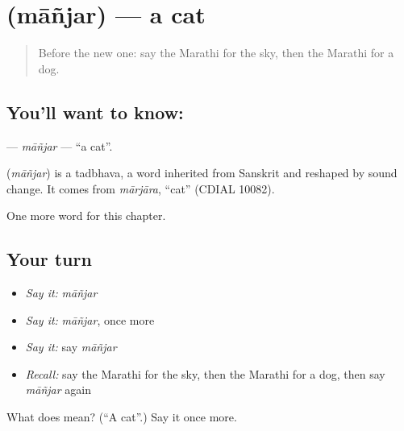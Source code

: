 \section[\texorpdfstring{\mr{मांजर} (māñjar)}{मांजर (māñjar)}]{ (māñjar) — a cat}

\label{lesson:MR-C99-manjar}



\begin{quote}
Before the new one: say the Marathi for the sky, then the Marathi for a dog.
\end{quote}

\subsection*{You'll want to know: }
\textbf{} — \emph{māñjar} — \textquotedblleft{}a cat\textquotedblright{}.

\begin{cousinweb}
\textbf{} (\emph{māñjar}) is a tadbhava, a word inherited from Sanskrit and reshaped by sound change. It comes from \emph{mārjāra}, \textquotedblleft{}cat\textquotedblright{} (CDIAL 10082).
\end{cousinweb}

\begin{grammarlens}[title={What you've built}]
One more word for this chapter.
\end{grammarlens}

\subsection*{Your turn}
\begin{itemize}
\raggedright
  \item \emph{Say it:} \emph{māñjar}
  \item \emph{Say it:} \emph{māñjar}, once more
  \item \emph{Say it:} say \emph{māñjar}
  \item \emph{Recall:} say the Marathi for the sky, then the Marathi for a dog, then say \emph{māñjar} again
\end{itemize}

\begin{tcolorbox}[breakable,colback=teal!4,colframe=teal!35!black,title={Before you move on}]
What does  mean? (\textquotedblleft{}A cat\textquotedblright{}.) Say it once more.
\end{tcolorbox}
